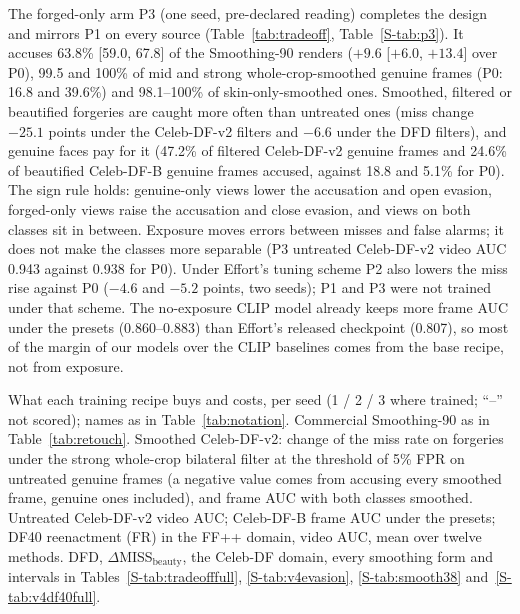 \documentclass[conference]{IEEEtran}
\begin{document}
The forged-only arm P3 (one seed, pre-declared reading) completes the design and mirrors P1 on every source
(Table~\ref{tab:tradeoff}, Table~\ref{S-tab:p3}). It accuses 63.8\% [59.0, 67.8] of the Smoothing-90 renders ($+9.6$ [$+6.0$, $+13.4$]
over P0), 99.5 and 100\% of mid and strong whole-crop-smoothed genuine frames (P0: 16.8 and 39.6\%) and 98.1--100\% of
skin-only-smoothed ones. Smoothed, filtered or beautified forgeries are caught more often than untreated ones (miss change
$-25.1$ points under the Celeb-DF-v2 filters and $-6.6$ under the DFD filters), and genuine faces pay for it (47.2\% of filtered
Celeb-DF-v2 genuine frames and 24.6\% of beautified Celeb-DF-B genuine frames accused, against 18.8 and 5.1\% for P0). The sign
rule holds: genuine-only views lower the accusation and open evasion, forged-only views raise the accusation and close evasion,
and views on both classes sit in between. Exposure moves errors between misses and false alarms; it does not make the classes more
separable (P3 untreated Celeb-DF-v2 video AUC 0.943 against 0.938 for P0). Under Effort's tuning scheme P2 also lowers the miss
rise against P0 ($-4.6$ and $-5.2$ points, two seeds); P1 and P3 were not trained under that scheme. The no-exposure CLIP model
already keeps more frame AUC under the presets (0.860--0.883) than Effort's released checkpoint (0.807), so most of the margin of
our models over the CLIP baselines comes from the base recipe, not from exposure.

\begin{table}[t]
\centering
\caption{What each training recipe buys and costs, per seed (1 / 2 / 3 where trained; ``--'' not scored); names as in
Table~\ref{tab:notation}. Commercial Smoothing-90 as in Table~\ref{tab:retouch}. Smoothed Celeb-DF-v2: change of the miss rate on
forgeries under the strong whole-crop bilateral filter at the threshold of 5\% FPR on untreated genuine frames (a negative value
comes from accusing every smoothed frame, genuine ones included), and frame AUC with both classes smoothed. Untreated Celeb-DF-v2
video AUC; Celeb-DF-B frame AUC under the presets; DF40 reenactment (FR) in the FF++ domain, video AUC, mean over twelve methods.
DFD, $\Delta$MISS$_\text{beauty}$, the Celeb-DF domain, every smoothing form and intervals in
Tables~\ref{S-tab:tradeofffull}, \ref{S-tab:v4evasion}, \ref{S-tab:smooth38} and~\ref{S-tab:v4df40full}.}
\label{tab:tradeoff}
\scriptsize
\setlength{\tabcolsep}{2.5pt}
\begin{adjustbox}{max width=\textwidth}\end{adjustbox}
\end{table}
\end{document}
